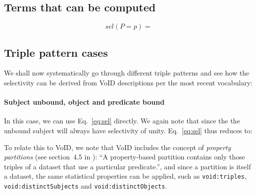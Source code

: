 \documentclass[12pt, draft]{article}
\newcommand{\rdfterm}[1]{\texttt{#1}}
\newcommand{\sel}[1]{\ensuremath{sel\left(#1\right)}}
\begin{document}
\subsection{Terms that can be computed}



\begin{equation}\label{eq:selpp}
\sel{P = p} = 
\end{equation}


\subsection{Triple pattern cases}

We shall now systematically go through different triple patterns and
see how the selectivity can be derived from VoID descriptions per the
most recent vocabulary\cite{voidnote}:

\paragraph{Subject unbound, object and predicate bound}

In this case, we can use Eq.~\ref{eq:sel} directly. We again note that
since the the unbound subject will always have selectivity of
unity.
Eq.~\ref{eq:sel} thus reduces to:


To relate this to VoID, we note that VoID includes the concept of
\emph{property partitions} (see section~4.5 in \cite{voidnote}): ``A
property-based partition contains only those triples of a dataset that
use a particular predicate.'', and since a partition is itself a
dataset, the same statistical properties can be applied, such as
\rdfterm{void:triples}, \rdfterm{void:distinctSubjects} and
\rdfterm{void:distinctObjects}. 

\end{document}
